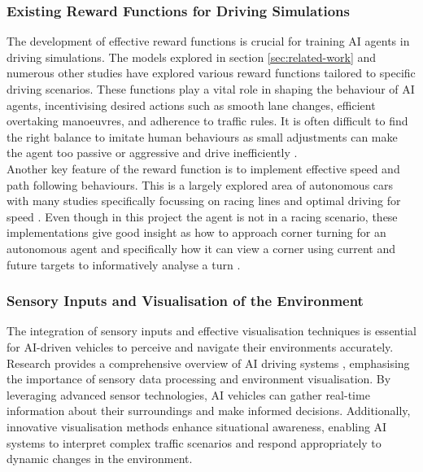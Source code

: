 \documentclass{article}
\begin{document}
\subsubsection{Existing Reward Functions for Driving Simulations}
\label{sec:existing-rewards}
The development of effective reward functions is crucial for training AI agents in driving simulations. The models explored in section \ref{sec:related-work} and numerous other studies have explored various reward functions tailored to specific driving scenarios. These functions play a vital role in shaping the behaviour of AI agents, incentivising desired actions such as smooth lane changes, efficient overtaking manoeuvres, and adherence to traffic rules. It is often difficult to find the right balance to imitate human behaviours as small adjustments can make the agent too passive or aggressive and drive inefficiently \cite{Predictive-reward-function-for-ai-driving}.\\ 

Another key feature of the reward function is to implement effective speed and path following behaviours. This is a largely explored area of autonomous cars with many studies specifically focussing on racing lines and optimal driving for speed \cite{Racing-reward-functions}. Even though in this project the agent is not in a racing scenario, these implementations give good insight as how to approach corner turning for an autonomous agent and specifically how it can view a corner using current and future targets to informatively analyse a turn \cite{Deep-learning-for-AI-driving}.

\subsubsection{Sensory Inputs and Visualisation of the Environment}
\label{sec:Sensory-Inputs}
The integration of sensory inputs and effective visualisation techniques is essential for AI-driven vehicles to perceive and navigate their environments accurately. Research provides a comprehensive overview of AI driving systems \cite{General-overview-of-ai-driving}, emphasising the importance of sensory data processing and environment visualisation. By leveraging advanced sensor technologies, AI vehicles can gather real-time information about their surroundings and make informed decisions. Additionally, innovative visualisation methods enhance situational awareness, enabling AI systems to interpret complex traffic scenarios and respond appropriately to dynamic changes in the environment.\\ 
\end{document}
